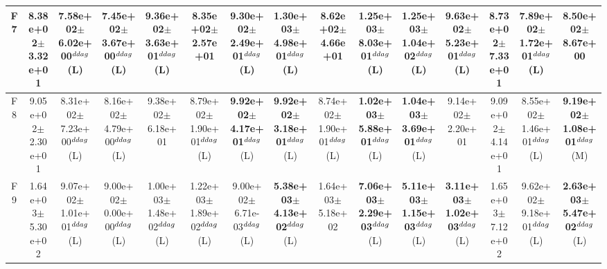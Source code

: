 \begin{table}[!t]
\begin{tabular}{c|cccccccccccccc}
F7  & 8.38e+02$\pm$3.32e+01  & 7.58e+02$\pm$6.02e+00$^{\\ddag}$ (L)  & 7.45e+02$\pm$3.67e+00$^{\\ddag}$ (L)  & \textbf{9.36e+02$\pm$3.63e+01}$^{\\ddag}$ (L)  & 8.35e+02$\pm$2.57e+01   & \textbf{9.30e+02$\pm$2.49e+01}$^{\\ddag}$ (L)  & \textbf{1.30e+03$\pm$4.98e+01}$^{\\ddag}$ (L)  & 8.62e+02$\pm$4.66e+01   & \textbf{1.25e+03$\pm$8.03e+01}$^{\\ddag}$ (L)  & \textbf{1.25e+03$\pm$1.04e+02}$^{\\ddag}$ (L)  & \textbf{9.63e+02$\pm$5.23e+01}$^{\\ddag}$ (L)  & 8.73e+02$\pm$7.33e+01   & 7.89e+02$\pm$1.72e+01$^{\\ddag}$ (L)  & 8.50e+02$\pm$8.67e+00  \\ \hline
F8  & 9.05e+02$\pm$2.30e+01  & 8.31e+02$\pm$7.23e+00$^{\\ddag}$ (L)  & 8.16e+02$\pm$4.79e+00$^{\\ddag}$ (L)  & 9.38e+02$\pm$6.18e+01   & 8.79e+02$\pm$1.90e+01$^{\\ddag}$ (L)  & \textbf{9.92e+02$\pm$4.17e+01}$^{\\ddag}$ (L)  & \textbf{9.92e+02$\pm$3.18e+01}$^{\\ddag}$ (L)  & 8.74e+02$\pm$1.90e+01$^{\\ddag}$ (L)  & \textbf{1.02e+03$\pm$5.88e+01}$^{\\ddag}$ (L)  & \textbf{1.04e+03$\pm$3.69e+01}$^{\\ddag}$ (L)  & 9.14e+02$\pm$2.20e+01   & 9.09e+02$\pm$4.14e+01   & 8.55e+02$\pm$1.46e+01$^{\\ddag}$ (L)  & \textbf{9.19e+02$\pm$1.08e+01}$^{\\ddag}$ (M) \\ \hline
F9  & 1.64e+03$\pm$5.30e+02  & 9.07e+02$\pm$1.01e+01$^{\\ddag}$ (L)  & 9.00e+02$\pm$0.00e+00$^{\\ddag}$ (L)  & 1.00e+03$\pm$1.48e+02$^{\\ddag}$ (L)  & 1.22e+03$\pm$1.89e+02$^{\\ddag}$ (L)  & 9.00e+02$\pm$6.71e-03$^{\\ddag}$ (L)  & \textbf{5.38e+03$\pm$4.13e+02}$^{\\ddag}$ (L)  & 1.64e+03$\pm$5.18e+02   & \textbf{7.06e+03$\pm$2.29e+03}$^{\\ddag}$ (L)  & \textbf{5.11e+03$\pm$1.15e+03}$^{\\ddag}$ (L)  & \textbf{3.11e+03$\pm$1.02e+03}$^{\\ddag}$ (L)  & 1.65e+03$\pm$7.12e+02   & 9.62e+02$\pm$9.18e+01$^{\\ddag}$ (L)  & \textbf{2.63e+03$\pm$5.47e+02}$^{\\ddag}$ (L) \\ \hline

\end{tabular}
\end{table}
